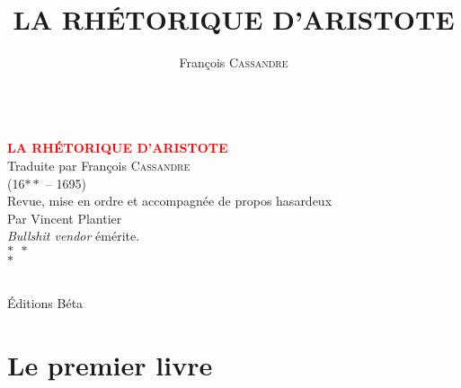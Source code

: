 \documentclass[11pt]{book}
\title{LA RHÉTORIQUE D'ARISTOTE}
\author{François \textsc{Cassandre}}
\begin{document}
\begin{titlepage}

	\centering
	
	~\\[\baselineskip] 

	\textcolor{Red}{\textbf{\Huge LA RHÉTORIQUE D'ARISTOTE}}\\[1.6\baselineskip] 
	
	{\LARGE Traduite par François \textsc{Cassandre}}\\{\small(16$**$ -- 1695)}\\[2.6\baselineskip]
	
	Revue, mise en ordre et accompagnée de propos hasardeux\\[0.6\baselineskip] 
	
	\Large Par Vincent Plantier\\[0.6\baselineskip]
	
	{	\footnotesize \emph{Bullshit vendor} émérite.\\$*~~*$\\$*$\\
	}
	
	
	\vfill 
	
	\\[0.5\baselineskip]
	
	Éditions Béta

\end{titlepage}

\renewcommand{\headrulewidth}{0pt}




\part{Le premier livre}

\renewcommand{\headrulewidth}{1pt}












\end{document}
